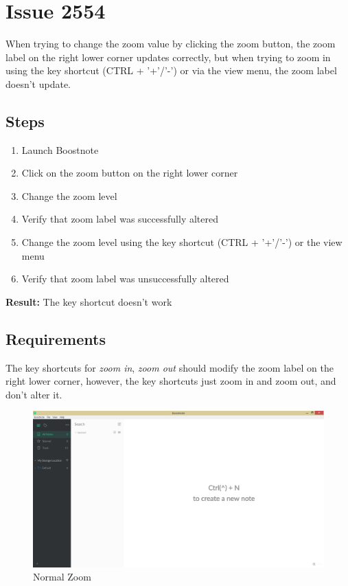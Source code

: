 \documentclass[main.tex]{subfiles}
\begin{document}
\section{Issue 2554}
\label{sec:2554}

When trying to change the zoom value by clicking the zoom button, the zoom label on the right lower corner updates correctly, but when trying to zoom in using the key shortcut (CTRL + '+'/'-') or via the view menu, the zoom label doesn't update.

\subsection{Steps}
\label{subsec:steps2554}

\begin{enumerate}[noitemsep]
\item Launch Boostnote
\item Click on the zoom button on the right lower corner
\item Change the zoom level
\item Verify that zoom label was successfully altered
\item Change the zoom level using the key shortcut (CTRL + '+'/'-') or the view menu
\item Verify that zoom label was unsuccessfully altered
\end{enumerate}

\textbf{Result:} The key shortcut doesn't work

\clearpage

\subsection{Requirements}

The key shortcuts for \textit{zoom in}, \textit{zoom out} should modify the zoom label on the right lower corner, however, the key shortcuts just zoom in and zoom out, and don't alter it.\\

\begin{figure}[htbp]
\includegraphics[scale=0.2]{images/normalZoom.png}
\centering
\caption{Normal Zoom}
\label{fig:normalzoom}
\end{figure}
\end{document}
